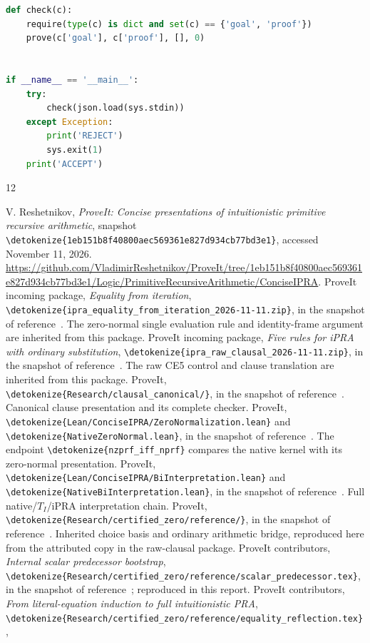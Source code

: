 \documentclass[11pt]{article}
\theoremstyle{definition}
\newcommand{\file}[1]{\expandafter\nolinkurl\expandafter{\detokenize{#1}}}
\begin{document}
\begin{lstlisting}[language=Python]
def check(c):
    require(type(c) is dict and set(c) == {'goal', 'proof'})
    prove(c['goal'], c['proof'], [], 0)


if __name__ == '__main__':
    try:
        check(json.load(sys.stdin))
    except Exception:
        print('REJECT')
        sys.exit(1)
    print('ACCEPT')
\end{lstlisting}

\clearpage
\begin{thebibliography}{12}
\small\raggedright
{} V. Reshetnikov, \emph{ProveIt: Concise presentations of
intuitionistic primitive recursive arithmetic}, snapshot
\file{1eb151b8f40800aec569361e827d934cb77bd3e1}, accessed November 11, 2026.
\url{https://github.com/VladimirReshetnikov/ProveIt/tree/1eb151b8f40800aec569361e827d934cb77bd3e1/Logic/PrimitiveRecursiveArithmetic/ConciseIPRA}.
 ProveIt incoming package,
\emph{Equality from iteration}, \file{ipra_equality_from_iteration_2026-11-11.zip},
in the snapshot of reference~\cite{baseline}. The zero-normal single
evaluation rule and identity-frame argument are inherited from this package.
 ProveIt incoming package,
\emph{Five rules for iPRA with ordinary substitution},
\file{ipra_raw_clausal_2026-11-11.zip}, in the snapshot of
reference~\cite{baseline}. The raw CE5 control and clause translation
are inherited from this package.
 ProveIt, \file{Research/clausal_canonical/}, in the snapshot
of reference~\cite{baseline}. Canonical clause presentation and its complete checker.
 ProveIt, \file{Lean/ConciseIPRA/ZeroNormalization.lean}
and \file{NativeZeroNormal.lean}, in the snapshot of reference~\cite{baseline}.
The endpoint \file{nzprf_iff_nprf} compares the native kernel with its
zero-normal presentation.
 ProveIt, \file{Lean/ConciseIPRA/BiInterpretation.lean}
and \file{NativeBiInterpretation.lean}, in the snapshot of
reference~\cite{baseline}. Full native/$T_I$/iPRA interpretation chain.
 ProveIt, \file{Research/certified_zero/reference/},
in the snapshot of reference~\cite{baseline}. Inherited choice basis and
ordinary arithmetic bridge, reproduced here from the attributed copy
in the raw-clausal package.
 ProveIt contributors, \emph{Internal scalar predecessor
bootstrap}, \file{Research/certified_zero/reference/scalar_predecessor.tex},
in the snapshot of reference~\cite{baseline}; reproduced in this report.
 ProveIt contributors, \emph{From literal-equation
induction to full intuitionistic PRA},
\file{Research/certified_zero/reference/equality_reflection.tex},

\end{thebibliography}
\end{document}
